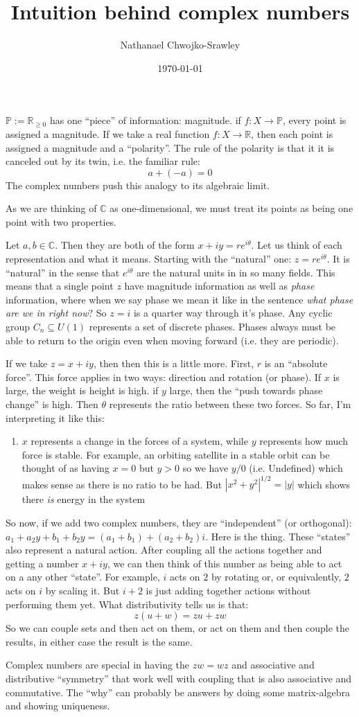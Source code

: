 \documentclass{article}
\title{Intuition behind complex numbers}
\author{Nathanael Chwojko-Srawley}
\date{\today}
\renewcommand{\maketitle}{
    \quad
    \vspace{1em}
  \begin{center}
      \LARGE\bfseries \thetitle \par
      \vspace{0.6em}
      \large
  \end{center}
    \vspace{1em}
}
\newcommand{\C}{{\mathbb{C}}}
\newcommand{\R}{{\mathbb{R}}}
\renewcommand{\P}{{\mathbb{P}}}
\newcommand{\sse}{\subseteq}
\begin{document}
\maketitle

$\P :=\R_{\ge 0}$ has one ``piece'' of information: magnitude. if $f: X \to \P$, every point is assigned
a magnitude. If we take a real function $f: X \to \R$, then each point is assigned a magnitude and
a ``polarity''. The rule of the polarity is that it it is canceled out by its twin, i.e. the familiar rule:
\[
  a + (-a) = 0
\]
The complex numbers push this analogy to its algebraic limit.

As we are thinking of $\C$ as one-dimensional, we must treat its points as being one point with two
properties.

Let $a,b \in \C$. Then they are both of the form $x+iy = re^{i\theta}$. Let us think of each representation
and what it means. Starting with the ``natural'' one: $z = re^{i\theta}$. It is ``natural'' in the sense that
$e^{i\theta}$ are the natural units in in so many fields. This means that a single point $z$
have magnitude information as well as \emph{phase} information, where when we say phase we mean it like in the
sentence \emph{what phase are we in right now}? So $z = i$ is a quarter way through it's phase. Any cyclic
group $C_n \sse U(1)$ represents a set of discrete phases. Phases always must be able to return to the origin
even when moving forward (i.e. they are periodic).

If we take $z = x+iy$, then then this is a little more. First, $r$ is an ``absolute force''. This force
applies in two ways: direction and rotation (or phase). If $x$ is large, the weight is height is high. if $y$
large, then the ``push towards phase change'' is high. Then $\theta$ represents the ratio between these two
forces. So far, I'm interpreting it like this:
\begin{enumerate}
  \item $x$ represents a change in the forces of a system, while $y$ represents how much force is stable. For
    example, an orbiting satellite in a stable orbit can be thought of as having $x = 0$ but $y > 0$ so we
    have $y/0$ (i.e. Undefined) which makes sense as there is no ratio to be had. But $|x^2+y^2|^{1/2} = |y|$
    which shows there \emph{is} energy in the system
\end{enumerate}

So now, if we add two complex numbers, they are ``independent'' (or orthogonal): $a_1 + a_2y + b_1 + b_2y = (a_1 + b_1)
+ (a_2+b_2)i$. Here is the thing. These ``states'' also represent a natural action. After coupling all the
actions together and getting a number $x+iy$, we can then think of this number as being able to act on a any
other ``state''. For example, $i$ acts on $2$ by rotating or, or equivalently, $2$ acts on $i$ by scaling it.
But $i+2$ is just adding together actions without performing them yet. What distributivity tells us is that:
\[
  z(u+w) = zu + zw
\]
So we can couple sets and then act on them, or act on them and then couple the results, in either case the
result is the same.

Complex numbers are special in having the $zw = wz$ and associative and distributive ``symmetry'' that work
well with coupling that is also associative and commutative. The ``why'' can probably be answers by doing some
matrix-algebra and showing uniqueness.

\end{document}
